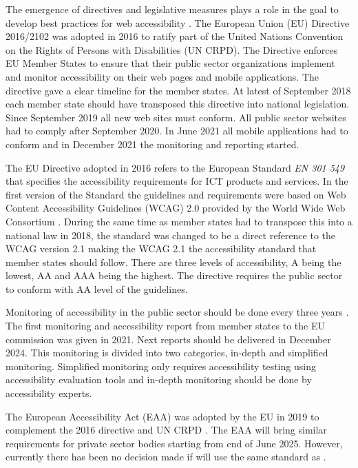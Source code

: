 The emergence of directives and legislative measures plays a role in the goal to develop best practices for web accessibility \citep{eudirective2016}. The European Union (EU) Directive 2016/2102 was adopted in 2016 to ratify part of the United Nations Convention on the Rights of Persons with Disabilities (UN CRPD). The Directive enforces EU Member States to ensure that their public sector organizations implement and monitor accessibility on their web pages and mobile applications. The directive gave a clear timeline for the member states. At latest of September 2018 each member state should have transposed this directive into national legislation. Since September 2019 all new web sites must conform. All public sector websites had to comply after September 2020. In June 2021 all mobile applications had to conform and in December 2021 the monitoring and reporting started. 

The EU Directive adopted in 2016 refers to the European Standard \textit{EN 301 549} that specifies the accessibility requirements for ICT products and services. In the first version of the Standard the guidelines and requirements were based on Web Content Accessibility Guidelines (WCAG) 2.0 provided by the World Wide Web Consortium \citep{wcagadoptioneurope}. During the same time as member states had to transpose this into a national law in 2018, the standard was changed to be a direct reference to the WCAG version 2.1 making the WCAG 2.1 the accessibility standard that member states should follow. There are three levels of accessibility, A being the lowest, AA and AAA being the highest. The directive requires the public sector to conform with AA level of the guidelines.

Monitoring of accessibility in the public sector should be done every three years \citep{eudirectivemonitoring}. The first monitoring and accessibility report from member states to the EU commission was given in 2021. Next reports should be delivered in December 2024. This monitoring is divided into two categories, in-depth and simplified monitoring. Simplified monitoring only requires accessibility testing using accessibility evaluation tools and in-depth monitoring should be done by accessibility experts. 

The European Accessibility Act (EAA) was adopted by the EU in 2019 to complement the 2016 directive and UN CRPD \citep{eudirective2019}. The EAA will bring similar requirements for private sector bodies starting from end of June 2025. However, currently there has been no decision made if \cite{eudirective2019} will use the same standard as \cite{eudirective2016}.


